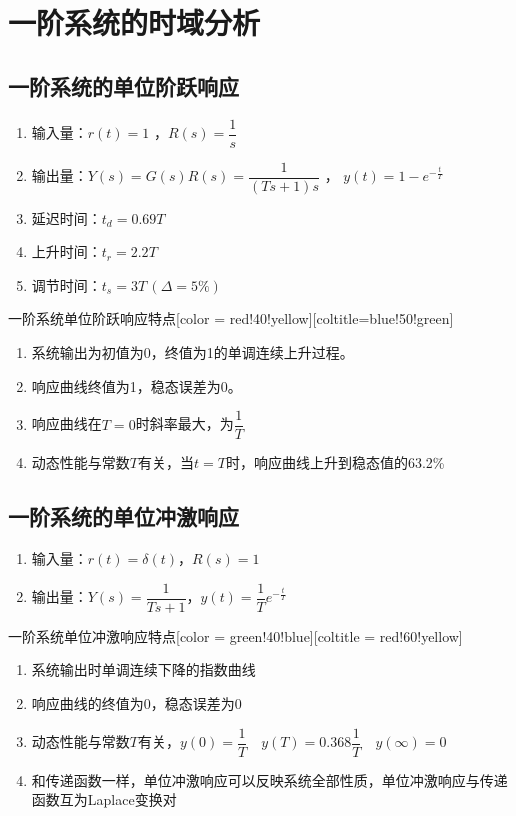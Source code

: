 \section{一阶系统的时域分析}
\subsection{一阶系统的单位阶跃响应}
\begin{enumerate}
    \item 输入量：$r(t) = 1$ ，$R(s) = \dfrac{1}{s}$
    \item 输出量：$Y(s) = G(s)R(s) = \dfrac{1} {(Ts+1)s}$ ， $y(t) = 1- e^{-\frac{t}{T}}$
    \item 延迟时间：$t_d = 0.69T$
    \item 上升时间：$t_r = 2.2T$ 
    \item 调节时间：$t_s = 3T \,(\Delta = 5\%)$
\end{enumerate}

\begin{ascolorbox3}{一阶系统单位阶跃响应特点}[color = red!40!yellow][coltitle=blue!50!green]
    \begin{enumerate}
        \item 系统输出为初值为0，终值为1的单调连续上升过程。
        \item 响应曲线终值为1，稳态误差为0。
        \item 响应曲线在$T=0$时斜率最大，为$\dfrac{1}{T}$
        \item 动态性能与常数$T$有关，当$t=T$时，响应曲线上升到稳态值的63.2\%
    \end{enumerate}
\end{ascolorbox3}

\subsection{一阶系统的单位冲激响应}
\begin{enumerate}
    \item 输入量：$r(t) = \delta(t)$，$R(s) = 1$ 
    \item 输出量：$Y(s) = \dfrac{1}{Ts+1}$，$y(t) = \dfrac{1}{T} e^{-\frac{t}{T}}$
\end{enumerate}

\begin{ascolorbox3}{一阶系统单位冲激响应特点}[color = green!40!blue][coltitle = red!60!yellow]
    \begin{enumerate}
        \item 系统输出时单调连续下降的指数曲线
        \item 响应曲线的终值为0，稳态误差为0
        \item 动态性能与常数$T$有关，$y(0) = \dfrac{1}{T}\quad y(T) = 0.368\dfrac{1}{T}\quad y(\infty) = 0$
        \item 和传递函数一样，单位冲激响应可以反映系统全部性质，单位冲激响应与传递函数互为Laplace变换对
    \end{enumerate}
\end{ascolorbox3}

